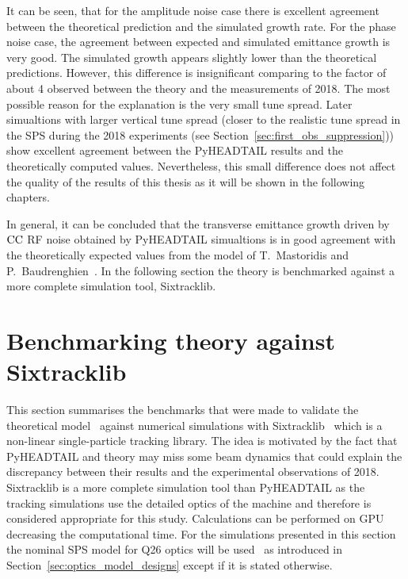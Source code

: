 It can be seen, that for the amplitude noise case there is excellent agreement between the theoretical prediction and the simulated growth rate. For the phase noise case, the agreement between expected and simulated emittance growth is very good. The simulated growth appears slightly lower than the theoretical predictions. However, this difference is insignificant comparing to the factor of about 4 observed between the theory and the measurements of 2018. The most possible reason for the explanation is the very small tune spread. Later simualtions with larger vertical tune spread (closer to the realistic tune spread in the SPS during the 2018 experiments (see Section~\ref{sec:first_obs_suppression})) show excellent agreement between the PyHEADTAIL results and the theoretically computed values. Nevertheless, this small difference does not affect the quality of the results of this thesis as it will be shown in the following chapters.

In general, it can be concluded that the transverse emittance growth driven by ${\mathrm{CC}}$ RF noise obtained by PyHEADTAIL simualtions is in good agreement with the theoretically expected values from the model of T.~Mastoridis and P.~Baudrenghien~\cite{PhysRevSTAB.18.101001}. In the following section the theory is benchmarked against a more complete simulation tool, Sixtracklib.


\section{Benchmarking theory against Sixtracklib}\label{sec:benchmark_theory_with_sixtracklib}
This section summarises the benchmarks that were made to validate the theoretical model~\cite{PhysRevSTAB.18.101001} against numerical simulations with Sixtracklib~\cite{sixtracklib_repo} which is a non-linear single-particle tracking library. The idea is motivated by the fact that PyHEADTAIL and theory may miss some beam dynamics that could explain the discrepancy between their results and the experimental observations of 2018. Sixtracklib is a more complete simulation tool than PyHEADTAIL as the tracking simulations use the detailed optics of the machine and therefore is considered appropriate for this study. Calculations can be performed on GPU decreasing the computational time. For the simulations presented in this section the nominal SPS model for Q26 optics will be used~\cite{cern_optics_repo} as introduced in Section~\ref{sec:optics_model_designs} except if it is stated otherwise.


